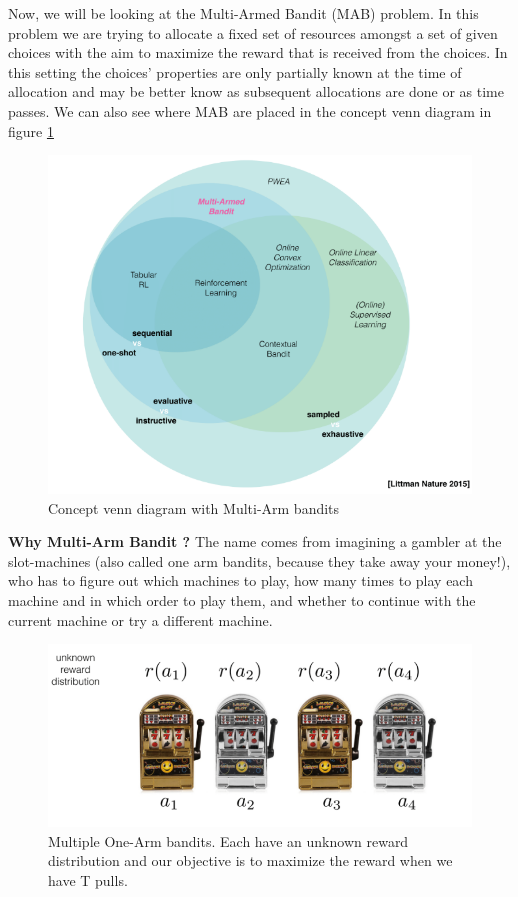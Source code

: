 \documentclass[11pt]{article}
\begin{document}
Now, we will be looking at the Multi-Armed Bandit (MAB) problem. In this problem we are trying to allocate a fixed set of resources amongst a set of given choices with the aim to maximize the reward that is received from the choices. In this setting the choices' properties are only partially known at the time of allocation and may be better know as subsequent allocations are done or as time passes.
We can also see where MAB are placed in the concept venn diagram in figure \ref{fig:MAB_round}

\begin{figure}
    \centering
    \includegraphics[width=0.75\linewidth]{images/MAB_round.png}
    \caption{Concept venn diagram with Multi-Arm bandits}
    \label{fig:MAB_round}
\end{figure}

\textbf{Why Multi-Arm Bandit ?}
The name comes from imagining a gambler at the slot-machines (also called one arm bandits, because they take away your money!), who has to figure out which machines to play, how many times to play each machine and in which order to play them, and whether to continue with the current machine or try a different machine.

\begin{figure}
    \centering
    \includegraphics[width=0.75\linewidth]{images/multi_arm_bandit_1.png}
    \caption{Multiple One-Arm bandits. Each have an unknown reward distribution and our objective is to maximize the reward when we have T pulls.}
    \label{fig:slot_machines}
\end{figure}
\end{document}
